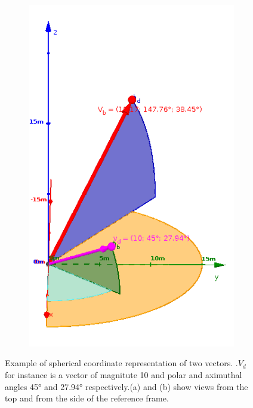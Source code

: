 \begin{figure}
\begin{subfigure}{1.0\textwidth}
		
	\end{subfigure}		
	\endminipage\hfil
	\begin{subfigure}{1.0\textwidth}
		\includegraphics[width=\linewidth]{./images/birdflocking/vertical}
		
	\end{subfigure}
	\endminipage
	\caption{Example of spherical coordinate representation of two vectors. .$V_d$ for instance is a vector of magnitute 10 and polar and aximuthal angles 45° and 27.94° respectively.(a) and (b) show views from the top and from the side of the reference frame.}
\end{figure}


